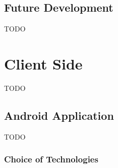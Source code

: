 \subsection{Future Development}

{TODO}





\section{Client Side}

{TODO}

\subsection{Android Application}

{TODO}

\subsubsection*{Choice of Technologies}
\label{sec:android_choice_of_tech}

